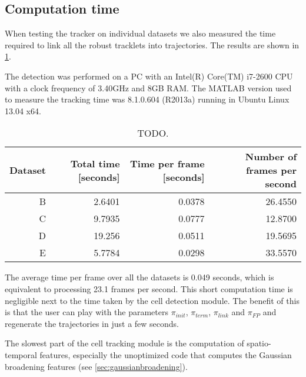 		
	\subsection{Computation time \statusnew}
	
	When testing the tracker on individual datasets we also measured the time required to link all the robust tracklets into trajectories. The results are shown in \cref{tab:results_tracker_speed}. 
	
	The detection was performed on a PC with an Intel(R) Core(TM) i7-2600 CPU with a clock frequency of 3.40GHz and 8GB RAM. The MATLAB version used to measure the tracking time was 8.1.0.604 (R2013a) running in Ubuntu Linux 13.04 x64.
	
	\begin{table}[h]
		\centering
		\begin{tabular}{rrrr}
			Dataset & Total time [seconds] & Time per frame [seconds] & Number of frames per second \\
		\hline
			      B &               2.6401 &                   0.0378 &                     26.4550 \\
			      C &               9.7935 &                   0.0777 &                     12.8700 \\
			      D &               19.256 &                   0.0511 &                     19.5695 \\
			      E &               5.7784 &                   0.0298 &                     33.5570
		\end{tabular} 
		\caption{TODO.}
		\label{tab:results_tracker_speed}
	\end{table}
	
	The average time per frame over all the datasets is 0.049 seconds, which is equivalent to processing 23.1 frames per second. This short computation time is negligible next to the time taken by the cell detection module. The benefit of this is that the user can play with the parameters $\pi_{init}$, $\pi_{term}$, $\pi_{link}$ and $\pi_{FP}$ and regenerate the trajectories in just a few seconds.
	
	The slowest part of the cell tracking module is the computation of spatio-temporal features, especially the unoptimized code that computes the Gaussian broadening features (see \cref{sec:gaussianbroadening}).
